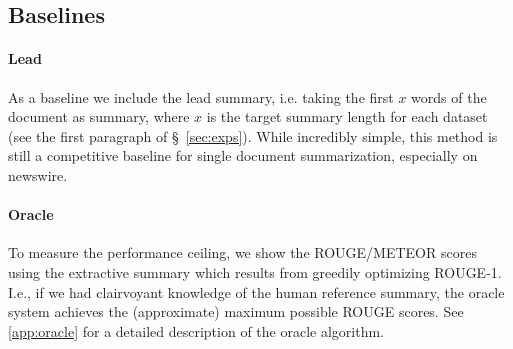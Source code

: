 \subsection{Baselines}
\paragraph{Lead} As a baseline we include the lead summary, i.e. taking the first 
$x$ words of the document as summary, where $x$ is the target summary length for each dataset (see the 
first paragraph of \S~\ref{sec:exps}). While incredibly simple, this method is still a 
competitive baseline for single document summarization, especially on newswire.
\paragraph{Oracle} To measure the performance ceiling,
we show the ROUGE/METEOR scores using the 
extractive summary which results from greedily optimizing ROUGE-1. I.e., if we 
had clairvoyant knowledge
of the human reference summary, the oracle system achieves the (approximate) 
maximum possible ROUGE scores. 
See \autoref{app:oracle} for a detailed
description of the oracle algorithm.











